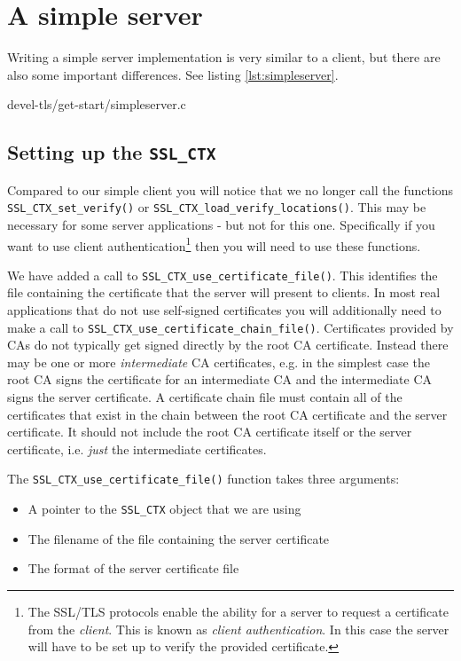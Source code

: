 \section{A simple server}

Writing a simple server implementation is very similar to a client, but there 
are also some important differences. See listing \ref{lst:simpleserver}.


{devel-tls/get-start/simpleserver.c}

\subsection{Setting up the \texttt{SSL\_CTX}}
\label{sec:get-start-setup-ssl-ctx}

Compared to our simple client you will notice that we no longer call the 
functions \verb!SSL_CTX_set_verify()! or \verb!SSL_CTX_load_verify_locations()!.
This may
be necessary for some server applications - but not for this one. Specifically 
if you want to use client authentication\footnote{The SSL/TLS protocols enable 
the ability for a server to request a certificate from the \emph{client}. This 
is known as \emph{client authentication}. In this case the server will have to 
be set up to verify the provided certificate.} then you will need to use these 
functions.

We have added a call to \verb!SSL_CTX_use_certificate_file()!. This identifies 
the file containing the certificate that the server will present to clients. In 
most real applications that do not use self-signed certificates you will 
additionally need to make a call to 
\verb!SSL_CTX_use_certificate_chain_file()!. Certificates provided by CAs do 
not typically get signed directly by the root CA certificate. Instead there may 
be one or more \emph{intermediate} CA certificates, e.g. in the simplest case 
the root CA signs the certificate for an intermediate CA and the intermediate 
CA signs the server certificate. A certificate chain file must contain all of 
the certificates that exist in the chain between the root CA certificate and the
server certificate. It should not include the root CA certificate itself or the
server certificate, i.e. \emph{just} the intermediate certificates.

The \verb!SSL_CTX_use_certificate_file()! function takes three arguments:

\begin{itemize}
\item A pointer to the \texttt{SSL\_CTX} object that we are using
\item The filename of the file containing the server certificate
\item The format of the server certificate file
\end{itemize}

